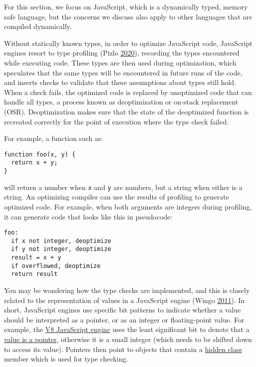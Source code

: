 \documentclass[a4paper,]{report}
\begin{document}
For this section, we focus on JavaScript, which is a dynamically typed,
memory safe language, but the concerns we discuss also apply to other
languages that are compiled dynamically.

Without statically known types, in order to optimize JavaScript code,
JavaScript engines resort to type profiling (Pizlo
\protect\hyperlink{ref-Pizlo2020}{2020}), recording the types
encountered while executing code. These types are then used during
optimization, which speculates that the same types will be encountered
in future runs of the code, and inserts checks to validate that these
assumptions about types still hold. When a check fails, the optimized
code is replaced by unoptimized code that can handle all types, a
process known as deoptimization or on-stack
replacement (OSR). Deoptimization
makes sure that the state of the deoptimized function is recreated
correctly for the point of execution where the type check failed.

For example, a function such as:

\begin{verbatim}
function foo(x, y) {
  return x + y;
}
\end{verbatim}

will return a number when \texttt{x} and \texttt{y} are numbers, but a
string when either is a string. An optimizing compiler can use the
results of profiling to generate optimized code. For example, when both
arguments are integers during profiling, it can generate code that looks
like this in pseudocode:

\begin{verbatim}
foo:
  if x not integer, deoptimize
  if y not integer, deoptimize
  result = x + y
  if overflowed, deoptimize
  return result
\end{verbatim}

You may be wondering how the type checks are implemented, and this is
closely related to the representation of values in a JavaScript engine
(Wingo \protect\hyperlink{ref-Wingo2011}{2011}). In short, JavaScript
engines use specific bit patterns to indicate whether a value should be
interpreted as a pointer, or as an integer or floating-point value. For
example, the \href{https://v8.dev/}{V8 JavaScript engine} uses the least
significant bit to denote that a
\href{https://v8.dev/blog/pointer-compression\#value-tagging-in-v8}{value
is a pointer}, otherwise it is a small integer (which needs to be
shifted down to access its value). Pointers then point to objects that
contain a \href{https://v8.dev/docs/hidden-classes}{hidden class} member
which is used for type checking.
\end{document}
